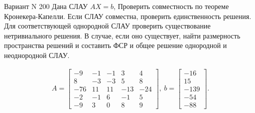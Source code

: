 \documentclass[11pt]{report}
\begin{document}
Вариант N 200
Дана СЛАУ $AX = b$,
Проверить совместность по теореме Кронекера-Капелли. Если СЛАУ совместна, проверить единственность решения.
Для соответствующей однородной СЛАУ проверить существование нетривиального решения. В случае, если оно существует,
найти размерность пространства решений и составить ФСР и общее решение однородной  и неоднородной СЛАУ.


\begin{align*}
 A = \left[\begin{matrix}-9 & -1 & -1 & 3 & 4\\8 & -3 & -3 & 5 & 8\\-76 & 11 & 11 & -13 & -24\\-2 & -1 & 6 & -1 & 5\\-9 & 3 & 0 & 8 & 9\end{matrix}\right],
\ b = \left[\begin{matrix}-16\\15\\-139\\-54\\-88\end{matrix}\right]. 
 \end{align*}
\end{document}
